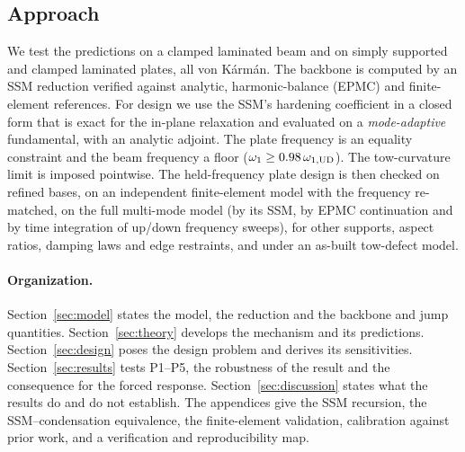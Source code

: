 \subsection{Approach}
We test the predictions on a clamped laminated beam and on simply supported and clamped
laminated plates, all von K\'arm\'an. The backbone is computed by an SSM reduction verified
against analytic, harmonic-balance (EPMC) and finite-element references. For design we use
the SSM's hardening coefficient in a closed form that is exact for the in-plane relaxation
and evaluated on a \emph{mode-adaptive} fundamental, with an analytic adjoint. The plate
frequency is an equality constraint and the beam frequency a floor
($\omega_1\geq0.98\,\omega_{1,\mathrm{UD}}$). The tow-curvature limit is imposed pointwise. The
held-frequency plate design is then checked on refined bases, on an independent
finite-element model with the frequency re-matched, on the full multi-mode model (by its
SSM, by EPMC continuation and by time integration of up/down frequency sweeps), for other
supports, aspect ratios, damping laws and edge restraints, and under an as-built tow-defect
model.

\begin{center}
\end{center}

\paragraph{Organization.} Section~\ref{sec:model} states the model, the reduction and the
backbone and jump quantities. Section~\ref{sec:theory} develops the mechanism and its
predictions. Section~\ref{sec:design} poses the design problem and derives its
sensitivities. Section~\ref{sec:results} tests P1--P5, the robustness of the result and the
consequence for the forced response. Section~\ref{sec:discussion} states what the results do
and do not establish. The appendices give the SSM recursion, the SSM--condensation
equivalence, the finite-element validation, calibration against prior work, and a
verification and reproducibility map.
